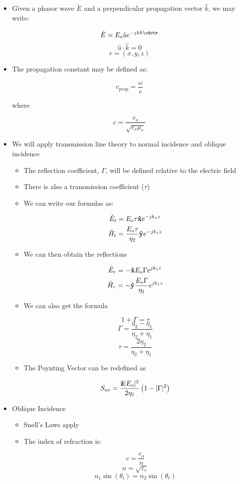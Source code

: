 \begin{itemize}

  \item Given a phasor wave $\tilde{E}$ and a perpendicular propagation vector $\hat{k}$, we may write:

    $$\tilde{E}=E_o\hat{u}e^{-jk\hat{k}\cdotr}$$
    $$\hat{u}\cdot\hat{k}=0$$
    $$r=(x,y,z)$$

  \item The propagation constant may be defined as:

    $$c_{prop}=\frac{\omega}{c}$$

    where 

    $$c=\frac{c_o}{\sqrt{\varepsilon_r\mu_r}}$$

  \item We will apply transmission line theory to normal incidence and oblique incidence

    \begin{itemize}

      \item The reflection coefficient, $\Gamma$, will be defined relative to the electric field

      \item There is also a transmission coefficient ($\tau$)
        
      \item We can write our formulas as:

        $$\tilde{E}_t=E_o\tau\bold{\hat{x}}e^{-jk_zz}$$
        $$\tilde{H}_t=\frac{E_o\tau}{\eta_2}\bold{\hat{y}}e^{-jk_zz}$$

      \item We can then obtain the reflections

        $$\tilde{E}_r=-\bold{\hat{x}}E_o\Gamma e^{jk_1z}$$
        $$\tilde{H}_r=-\bold{\hat{y}}\frac{E_o\Gamma}{\eta_1} e^{jk_1z}$$

      \item We can also get the formula

        $$1+\Gamma=\tau$$
        $$\Gamma=\frac{\eta_2-\eta_1}{\eta_2+\eta_1}$$
        $$\tau=\frac{2\eta_2}{\eta_2+\eta_1}$$

      \item The Poynting Vector can be redefined as

        $$S_{av}=\frac{\bold{\hat{z}}|E_o|^2}{2\eta_1}\left( 1-|\Gamma|^2 \right)$$

    \end{itemize}

  \item Oblique Incidence

    \begin{itemize}

      \item Snell's Laws apply

      \item The index of refraction is:

        $$c=\frac{c_o}{n}$$
        $$n=\sqrt{\varepsilon_r}$$
        $$n_1\sin(\theta_i)=n_2\sin(\theta_t)$$

    \end{itemize}

\end{itemize}



